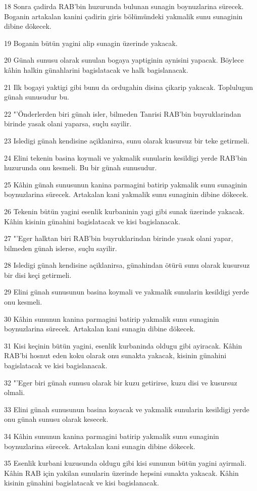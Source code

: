\par 18 Sonra çadirda RAB'bin huzurunda bulunan sunagin boynuzlarina sürecek. Boganin artakalan kanini çadirin giris bölümündeki yakmalik sunu sunaginin dibine dökecek.
\par 19 Boganin bütün yagini alip sunagin üzerinde yakacak.
\par 20 Günah sunusu olarak sunulan bogaya yaptiginin aynisini yapacak. Böylece kâhin halkin günahlarini bagislatacak ve halk bagislanacak.
\par 21 Ilk bogayi yaktigi gibi bunu da ordugahin disina çikarip yakacak. Toplulugun günah sunusudur bu.
\par 22 "'Önderlerden biri günah isler, bilmeden Tanrisi RAB'bin buyruklarindan birinde yasak olani yaparsa, suçlu sayilir.
\par 23 Isledigi günah kendisine açiklanirsa, sunu olarak kusursuz bir teke getirmeli.
\par 24 Elini tekenin basina koymali ve yakmalik sunularin kesildigi yerde RAB'bin huzurunda onu kesmeli. Bu bir günah sunusudur.
\par 25 Kâhin günah sunusunun kanina parmagini batirip yakmalik sunu sunaginin boynuzlarina sürecek. Artakalan kani yakmalik sunu sunaginin dibine dökecek.
\par 26 Tekenin bütün yagini esenlik kurbaninin yagi gibi sunak üzerinde yakacak. Kâhin kisinin günahini bagislatacak ve kisi bagislanacak.
\par 27 "'Eger halktan biri RAB'bin buyruklarindan birinde yasak olani yapar, bilmeden günah islerse, suçlu sayilir.
\par 28 Isledigi günah kendisine açiklanirsa, günahindan ötürü sunu olarak kusursuz bir disi keçi getirmeli.
\par 29 Elini günah sunusunun basina koymali ve yakmalik sunularin kesildigi yerde onu kesmeli.
\par 30 Kâhin sununun kanina parmagini batirip yakmalik sunu sunaginin boynuzlarina sürecek. Artakalan kani sunagin dibine dökecek.
\par 31 Kisi keçinin bütün yagini, esenlik kurbaninda oldugu gibi ayiracak. Kâhin RAB'bi hosnut eden koku olarak onu sunakta yakacak, kisinin günahini bagislatacak ve kisi bagislanacak.
\par 32 "'Eger biri günah sunusu olarak bir kuzu getirirse, kuzu disi ve kusursuz olmali.
\par 33 Elini günah sunusunun basina koyacak ve yakmalik sunularin kesildigi yerde onu günah sunusu olarak kesecek.
\par 34 Kâhin sununun kanina parmagini batirip yakmalik sunu sunaginin boynuzlarina sürecek. Artakalan kani sunagin dibine dökecek.
\par 35 Esenlik kurbani kuzusunda oldugu gibi kisi sununun bütün yagini ayirmali. Kâhin RAB için yakilan sunularin üzerinde hepsini sunakta yakacak. Kâhin kisinin günahini bagislatacak ve kisi bagislanacak.

